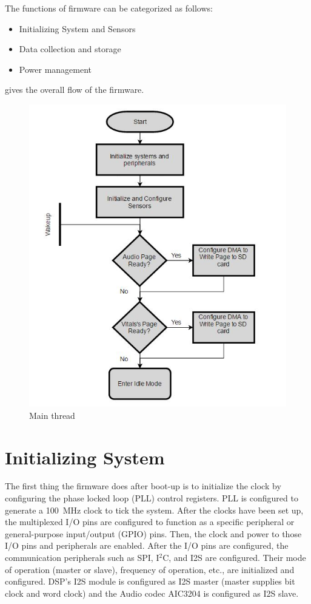 The functions of firmware can be categorized as follows:
 \begin{itemize}
 	\item Initializing System and Sensors 
 	\item Data collection and storage
 	\item Power management 
 \end{itemize}
 gives the overall flow of the firmware.
 \begin{figure}
	\centering
	\includegraphics[scale = 1 ]{main}
\caption{Main thread}
\label{main}
\end{figure}

\section{Initializing System}

The first thing the firmware does after boot-up is to initialize the
clock by configuring the phase locked loop (PLL) control registers.
PLL is configured to generate a 100~MHz clock to tick the system.
After the clocks have been set up, the multiplexed I/O pins are
configured to function as a specific peripheral or general-purpose
input/output (GPIO) pins. Then, the clock and power to those I/O pins
and peripherals are enabled. After the I/O pins are configured, the
communication peripherals such as SPI, I$^2$C, and I2S are
configured. Their mode of operation (master or slave), frequency of
operation, etc., are initialized and configured. DSP's I2S module is
configured as I2S master (master supplies bit clock and word clock)
and the Audio codec AIC3204 is configured as I2S slave. 

